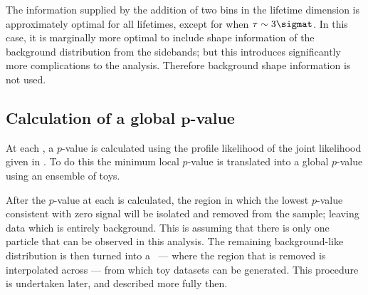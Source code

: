 The information supplied by the addition of two bins in the lifetime dimension is approximately
optimal for all \db lifetimes, except for when $\tau\sim3\sigmat$.
In this case, it is marginally more optimal to include shape information of the background
distribution from the sidebands; but this introduces
significantly more complications to the analysis.
Therefore background shape information is not used.


\subsection[Calculation of a global $p$-value]
{Calculation of a global $\boldsymbol{p}$-value}
\label{sec:db:pval}
At each , a $p$-value is calculated using the profile likelihood of the joint likelihood
given in .
To do this the minimum local $p$-value is translated into a global $p$-value using an ensemble of
toys.

After the $p$-value at each  is calculated, the region in which the lowest $p$-value
consistent with zero signal will be isolated and removed from the sample; leaving data
which is entirely background.
This is assuming that there is only one \np particle that can be observed in this analysis.
The remaining background-like distribution is then turned into a \PDF\ --- where the region that is
removed is interpolated across --- from which toy datasets can be generated.
This procedure is undertaken later, and described more fully then.

